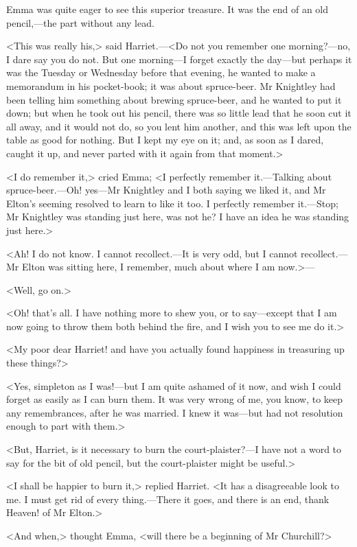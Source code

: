 Emma was quite eager to see this superior treasure. It was the end of an old pencil,—the part without any lead.

<This was really his,> said Harriet.—<Do not you remember one morning?—no, I dare say you do not. But one morning—I forget exactly the day—but perhaps it was the Tuesday or Wednesday before that evening, he wanted to make a memorandum in his pocket-book; it was about spruce-beer. Mr Knightley had been telling him something about brewing spruce-beer, and he wanted to put it down; but when he took out his pencil, there was so little lead that he soon cut it all away, and it would not do, so you lent him another, and this was left upon the table as good for nothing. But I kept my eye on it; and, as soon as I dared, caught it up, and never parted with it again from that moment.>

<I do remember it,> cried Emma; <I perfectly remember it.—Talking about spruce-beer.—Oh! yes—Mr Knightley and I both saying we liked it, and Mr Elton's seeming resolved to learn to like it too. I perfectly remember it.—Stop; Mr Knightley was standing just here, was not he? I have an idea he was standing just here.>

<Ah! I do not know. I cannot recollect.—It is very odd, but I cannot recollect.—Mr Elton was sitting here, I remember, much about where I am now.>—

<Well, go on.>

<Oh! that's all. I have nothing more to shew you, or to say—except that I am now going to throw them both behind the fire, and I wish you to see me do it.>

<My poor dear Harriet! and have you actually found happiness in treasuring up these things?>

<Yes, simpleton as I was!—but I am quite ashamed of it now, and wish I could forget as easily as I can burn them. It was very wrong of me, you know, to keep any remembrances, after he was married. I knew it was—but had not resolution enough to part with them.>

<But, Harriet, is it necessary to burn the court-plaister?—I have not a word to say for the bit of old pencil, but the court-plaister might be useful.>

<I shall be happier to burn it,> replied Harriet. <It has a disagreeable look to me. I must get rid of every thing.—There it goes, and there is an end, thank Heaven! of Mr Elton.>

<And when,> thought Emma, <will there be a beginning of Mr Churchill?>

